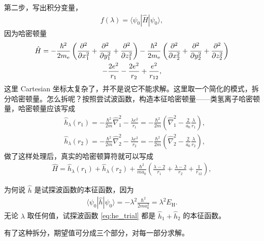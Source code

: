 第二步，写出积分变量，
\begin{align}
    f(\lambda) = \langle \psi_0 | \hat H | \psi_0 \rangle,
\end{align}
因为哈密顿量
\begin{multline}
    \hat H 
    = -\frac{\hbar^2}{2m_\mathrm{e}} \left(\pdv[2]{x_1} + \pdv[2]{y_1} + \pdv[2]{z_1}\right) 
    - \frac{\hbar^2}{2m_\mathrm{e}} \left(\pdv[2]{x_2} + \pdv[2]{y_2} + \pdv[2]{z_2}\right) \\
    - \frac{2e^2}{r_1} - \frac{2e^2}{r_2} + \frac{e^2}{r_{12}},
\end{multline}
这里 Cartesian 坐标太复杂了，并不是说它不能求解。这里取一个简化的模式，拆分哈密顿量。怎么拆呢？按照尝试波函数，构造本征哈密顿量——类氢离子哈密顿量，哈密顿量应该写成
\begin{align}
    &\hat h_\lambda (r_1) = -\frac{\hbar^2}{2m} \hat\nabla_1^2 - \frac{\lambda e^2}{r_1} = -\frac{\hbar^2}{2m} \left(\hat\nabla_1^2 - \frac{2}{a_0}\frac{\lambda}{r_1}\right), \\
    &\hat h_{\lambda}(r_2) = -\frac{\hbar^2}{2m} \hat\nabla_2^2 - \frac{\lambda e^2}{r_2} = -\frac{\hbar^2}{2m} \left(\hat\nabla_2^2 - \frac{2}{a_0}\frac{\lambda}{r_2}\right), 
\end{align}
做了这样处理后，真实的哈密顿算符就可以写成
\begin{align}
    \hat H = \hat h_\lambda (r_1) + \hat h_\lambda (r_2)
    + \frac{\hbar^2}{ma_0} 
    \left(
        \frac{\lambda-2}{r_1} + 
        \frac{\lambda-2}{r_2} + 
        \frac1{r_{12}}
    \right),
\end{align}

为何说 $\hat h$ 是试探波函数的本征函数，因为
\begin{align}
    \langle \psi_0 | \hat h | \psi_0 \rangle = - \lambda^2 \frac{\hbar^2}{2m a_0^2} = \lambda^2 E_{\text{H}}. 
\end{align}
无论 $\lambda$ 取任何值，试探波函数 \eqref{eq:he_trial}
都是 $\hat h_1 + \hat h_2$ 的本征函数。

有了这种拆分，期望值可分成三个部分，对每一部分求解。

